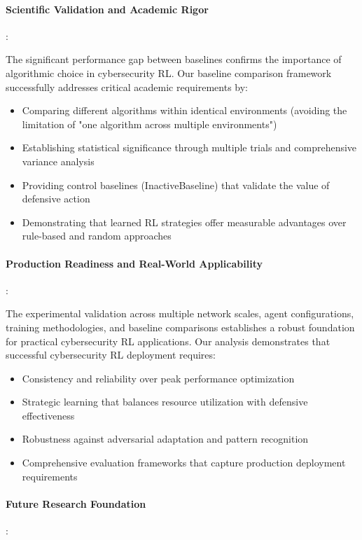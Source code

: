 \documentclass[12pt,oneside]{article}
\begin{document}
\paragraph{Scientific Validation and Academic Rigor}:

The significant performance gap between baselines confirms the importance of algorithmic choice in cybersecurity RL. Our baseline comparison framework successfully addresses critical academic requirements by:
\begin{itemize}
\item Comparing different algorithms within identical environments (avoiding the limitation of "one algorithm across multiple environments")
\item Establishing statistical significance through multiple trials and comprehensive variance analysis
\item Providing control baselines (InactiveBaseline) that validate the value of defensive action
\item Demonstrating that learned RL strategies offer measurable advantages over rule-based and random approaches
\end{itemize}

\paragraph{Production Readiness and Real-World Applicability}:

The experimental validation across multiple network scales, agent configurations, training methodologies, and baseline comparisons establishes a robust foundation for practical cybersecurity RL applications. Our analysis demonstrates that successful cybersecurity RL deployment requires:
\begin{itemize}
\item Consistency and reliability over peak performance optimization
\item Strategic learning that balances resource utilization with defensive effectiveness
\item Robustness against adversarial adaptation and pattern recognition
\item Comprehensive evaluation frameworks that capture production deployment requirements
\end{itemize}

\paragraph{Future Research Foundation}:
\end{document}
